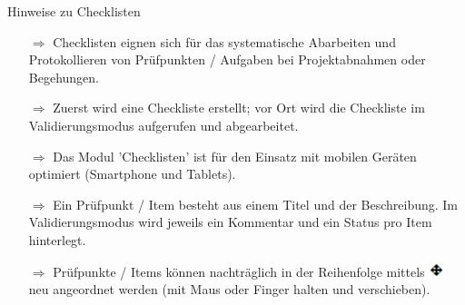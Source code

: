 \documentclass{article}
\begin{document}
\begin{beamerlikethm}{Hinweise zu Checklisten}
\begin{itemize}
  \item[$\Longrightarrow$] Checklisten eignen sich für das systematische Abarbeiten und Protokollieren von Prüfpunkten / Aufgaben bei Projektabnahmen oder Begehungen.
  \item[$\Longrightarrow$] Zuerst wird eine Checkliste erstellt; vor Ort wird die Checkliste im Validierungsmodus aufgerufen und abgearbeitet.
  \item[$\Longrightarrow$] Das Modul 'Checklisten' ist für den Einsatz mit mobilen Geräten optimiert (Smartphone und Tablets).	
  \item[$\Longrightarrow$] Ein Prüfpunkt / Item besteht aus einem Titel und der Beschreibung. Im Validierungsmodus wird jeweils ein Kommentar und ein Status pro Item hinterlegt.
  \item[$\Longrightarrow$] Prüfpunkte / Items können nachträglich in der Reihenfolge mittels \includegraphics[height=12pt]{Icons/verschieben.jpg} neu angeordnet werden (mit Maus oder Finger halten und verschieben).	
\end{itemize}
\end{beamerlikethm}

\end{document}
